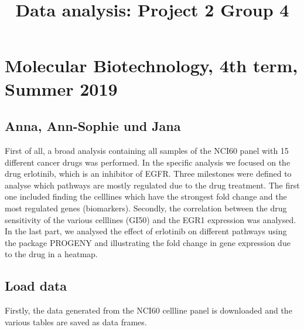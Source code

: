 \documentclass[]{article}
\title{Data analysis: Project 2 Group 4}
\author{}
\date{}
\begin{document}
\maketitle

\hypertarget{molecular-biotechnology-4th-term-summer-2019}{%
\section{Molecular Biotechnology, 4th term, Summer
2019}\label{molecular-biotechnology-4th-term-summer-2019}}

\hypertarget{anna-ann-sophie-und-jana}{%
\subsection{Anna, Ann-Sophie und Jana}\label{anna-ann-sophie-und-jana}}

First of all, a broad analysis containing all samples of the NCI60 panel
with 15 different cancer drugs was performed. In the specific analysis
we focused on the drug erlotinib, which is an inhibitor of EGFR. Three
milestones were defined to analyse which pathways are mostly regulated
due to the drug treatment. The first one included finding the celllines
which have the strongest fold change and the most regulated genes
(biomarkers). Secondly, the correlation between the drug sensitivity of
the various celllines (GI50) and the EGR1 expression was analysed. In
the last part, we analysed the effect of erlotinib on different pathways
using the package PROGENY and illustrating the fold change in gene
expression due to the drug in a heatmap.

\hypertarget{load-data}{%
\subsection{Load data}\label{load-data}}

Firstly, the data generated from the NCI60 cellline panel is downloaded
and the various tables are saved as data frames.
\end{document}
